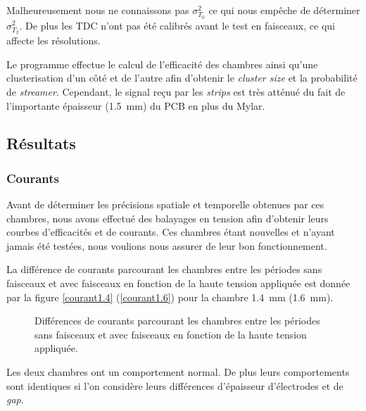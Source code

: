 Malheureusement nous ne connaissons pas $\sigma_{T_0}^2$ ce qui nous empêche de déterminer $\sigma_{T_2}^2$. De plus les TDC n'ont pas été calibrés avant le test en faisceaux, ce qui affecte les résolutions.

Le programme effectue le calcul de l'efficacité des chambres ainsi  qu'une clusterisation d'un côté et de l'autre afin d'obtenir le \textit{cluster size} et la probabilité de \textit{streamer}. Cependant, le signal reçu par les \textit{strips} est très atténué du fait de l'importante épaisseur (\SI{1.5}{\milli\meter}) du PCB en plus du Mylar.%

\subsection{Résultats}


\subsubsection{Courants}
Avant de déterminer les précisions spatiale et temporelle obtenues par ces chambres, nous avons effectué des balayages en tension afin d'obtenir leurs courbes d'efficacités et de courants. Ces chambres étant nouvelles et n'ayant jamais été testées, nous voulions nous assurer de leur bon fonctionnement.

La différence de courants parcourant les chambres entre les périodes sans faisceaux et avec faisceaux en fonction de la haute tension appliquée est donnée par la figure \ref{courant1.4} (\ref{courant1.6}) pour la chambre \SI{1.4}{\milli\meter} (\SI{1.6}{\milli\meter}).

\begin{figure}[ht!]
	\vspace{-0.5cm}
	\centering
	\caption{Différences de courants parcourant les chambres entre les périodes sans faisceaux et avec faisceaux en fonction de la haute tension appliquée.}
	\label{courant1.41.6}
\end{figure}

Les deux chambres ont un comportement normal. De plus leurs comportements sont identiques si l'on considère leurs différences d'épaisseur d'électrodes et de \textit{gap}.

